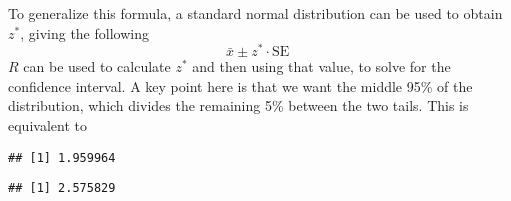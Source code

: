 To generalize this formula, a standard normal distribution can be used to obtain $z^*$, giving the following 
\[ \bar{x} \pm z^* \cdot \text{SE } \]
$R$ can be used to calculate $z^*$ and then using that value, to solve for the confidence interval.  A key point here is that we want the middle 95\% of the distribution, which divides the remaining 5\% between the two tails.  This is equivalent to 
\begin{knitrout}
\color{fgcolor}\begin{kframe}
\begin{alltt}
 \hlkwb{=} 
 \hlkwb{=} \hlstd{(}  \hlopt{+} \hlstd{(}\hlopt{-}\hlopt{/}\hlstd{,}  \hlstd{=} \hlstd{)}
\end{alltt}
\begin{verbatim}
## [1] 1.959964
\end{verbatim}
\begin{alltt}
 \hlkwb{=}  \hlopt{-} \hlopt{*} \hlopt{+} \hlopt{*}
\end{alltt}


{\ttfamily\noindent\bfseries\color{errorcolor}{\#\# Error in eval(expr, envir, enclos): object 'xbar' not found}}\begin{alltt}
\end{alltt}


{\ttfamily\noindent\bfseries\color{errorcolor}{\#\# Error in eval(expr, envir, enclos): object 'ci' not found}}\end{kframe}
\end{knitrout}

\begin{knitrout}
\color{fgcolor}\begin{kframe}
\begin{alltt}
 \hlkwb{=} 
 \hlkwb{=} \hlstd{(}  \hlopt{+} \hlstd{(}\hlopt{-}\hlopt{/}\hlstd{,}  \hlstd{=} \hlstd{)}
\end{alltt}
\begin{verbatim}
## [1] 2.575829
\end{verbatim}
\end{kframe}
\end{knitrout}


